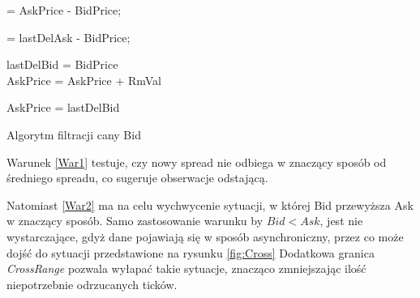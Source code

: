 \documentclass[a4paper,12pt,openany, DIV=calc, headsepline]{scrbook}
\begin{document}
\IncMargin{5em}
\begin{algorithm}

\Spt = AskPrice - BidPrice; 



\label{War1}
{
\label{Zab1}	\Spt = lastDelAsk - BidPrice; 

	{
		lastDelBid = BidPrice\\
\label{Zab2} AskPrice = AskPrice + RmVal\\


	
	}
	
\label{Uwaga1}	AskPrice = lastDelBid
	
}

\caption{Algorytm filtracji cany Bid\label{FiltrBID}}
\end{algorithm}
\DecMargin{5em}

Warunek \ref{War1} testuje, czy nowy spread nie odbiega w znaczący sposób od średniego spreadu, co sugeruje obserwacje odstającą. 

Natomiast \ref{War2} ma na celu wychwycenie sytuacji, w której Bid przewyższa Ask w znaczący sposób. Samo zastosowanie warunku by $Bid < Ask$, jest nie wystarczające, gdyż dane pojawiają się w sposób asynchroniczny, przez co może dojść do sytuacji przedstawione na rysunku \ref{fig:Cross} Dodatkowa granica \emph{CrossRange} pozwala wyłapać takie sytuacje, znacząco zmniejszając ilość niepotrzebnie odrzucanych ticków.
\end{document}
